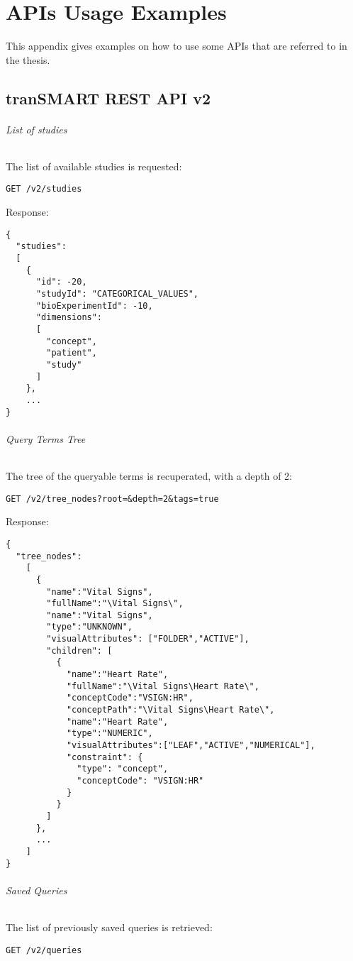 \chapter{APIs Usage Examples}

This appendix gives examples on how to use some APIs that are referred to in the thesis.

\section{tranSMART REST API v2}

\subparagraph{List of studies}
The list of available studies is requested:
\begin{verbatim}
GET /v2/studies
\end{verbatim}

Response:
\begin{verbatim}
{
  "studies": 
  [
    {
      "id": -20,
      "studyId": "CATEGORICAL_VALUES",
      "bioExperimentId": -10,
      "dimensions": 
      [
        "concept",
        "patient",
        "study"
      ]
    },
    ...
}
\end{verbatim}

\subparagraph{Query Terms Tree}
The tree of the queryable terms is recuperated, with a depth of 2:
\begin{verbatim}
GET /v2/tree_nodes?root=&depth=2&tags=true
\end{verbatim}

Response:
\begin{verbatim}
{
  "tree_nodes":
    [
      {
        "name":"Vital Signs",
        "fullName":"\Vital Signs\",
        "name":"Vital Signs",
        "type":"UNKNOWN",
        "visualAttributes": ["FOLDER","ACTIVE"], 
        "children": [
          {
            "name":"Heart Rate",
            "fullName":"\Vital Signs\Heart Rate\",
            "conceptCode":"VSIGN:HR",
            "conceptPath":"\Vital Signs\Heart Rate\",
            "name":"Heart Rate",
            "type":"NUMERIC",
            "visualAttributes":["LEAF","ACTIVE","NUMERICAL"],
            "constraint": {
              "type": "concept",
              "conceptCode": "VSIGN:HR"
            }
          }
        ]
      },
      ...
    ]
}
\end{verbatim}

\subparagraph{Saved Queries}
The list of previously saved queries is retrieved:
\begin{verbatim}
GET /v2/queries
\end{verbatim}

